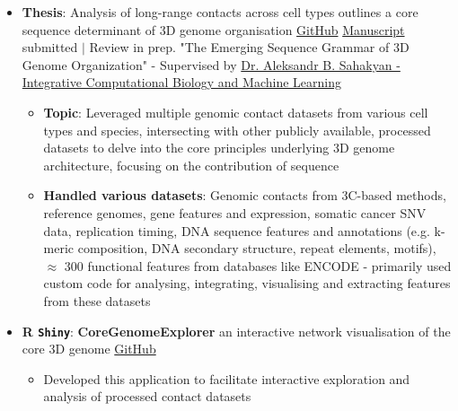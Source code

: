 \documentclass{article}
\newcommand{\resumeItem}[2]{
  \item\small{
    \textbf{#1}{: #2 \vspace{-2pt}}
  }
}
\newcommand{\resumeItemListStart}{\begin{itemize}}
\newcommand{\resumeItemListEnd}{\end{itemize}\vspace{-5pt}}
\begin{document}
            \resumeItemListStart
                \resumeItem{Thesis}{Analysis of long-range contacts across cell types outlines a core sequence determinant of 3D genome organisation \href{https://github.com/SahakyanLab/GenomicContactDynamics}{GitHub} \href{https://drive.google.com/file/d/1j3xg4ipr3ruG7vPtyXWO4wrDjJaRznfg/view?usp=share_link}{Manuscript} submitted $|$ Review in prep. "The Emerging Sequence Grammar of 3D Genome Organization" - Supervised by \href{https://www.imm.ox.ac.uk/research/research-groups/sahakyan-group-integrative-computational-biology-and-machine-learning}{Dr. Aleksandr B. Sahakyan - Integrative Computational Biology and Machine Learning}}
                    \begin{itemize}
                        \resumeItem {Topic}{Leveraged multiple genomic contact datasets from various cell types and species, intersecting with other publicly available, processed datasets to delve into the core principles underlying 3D genome architecture, focusing on the contribution of sequence}
                        \resumeItem {Handled various datasets}{Genomic contacts from 3C-based methods, reference genomes, gene features and expression, somatic cancer SNV data, replication timing, DNA sequence features and annotations (e.g. k-meric composition, DNA secondary structure, repeat elements, motifs), $\approx$ 300 functional features from databases like ENCODE - primarily used custom code for analysing, integrating, visualising and extracting features from these datasets}
                    \end{itemize}
            \resumeItemListEnd

            \resumeItemListStart
                \resumeItem{R \texttt{Shiny}}{\textbf{CoreGenomeExplorer} an interactive network visualisation of the core 3D genome \href{https://github.com/liezeltamon/CoreGenomeExplorerLite}{GitHub}}
                    \begin{itemize}
                        \item {Developed this application to facilitate interactive exploration and analysis of processed contact datasets}
                    \end{itemize}
            \resumeItemListEnd
            
\end{document}
